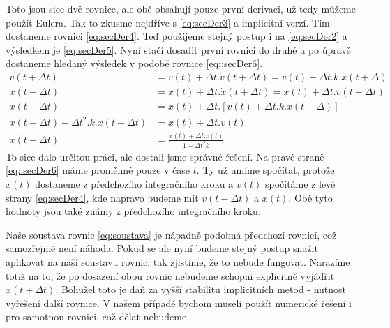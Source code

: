 Toto jsou sice dvě rovnice, ale obě obsahují pouze první derivaci, už tedy můžeme použít Eulera. Tak to zkusme nejdříve s \eqref{eq:secDer3} a implicitní verzí. Tím dostaneme rovnici \eqref{eq:secDer4}. Teď použijeme stejný postup i na \eqref{eq:secDer2} a výsledkem je \eqref{eq:secDer5}. Nyní stačí dosadit první rovnici do druhé a po úpravě dostaneme hledaný výsledek v podobě rovnice \eqref{eq::secDer6}.
\begin{align}
\label{eq:secDer4}
 v(t + \Delta t)&=v(t) + \Delta t . \dot{v}(t + \Delta t)  
 =  v(t) + \Delta t . k.x(t + \Delta)\\
 \label{eq:secDer5}
 x(t+\Delta t) &= x(t) + \Delta t. \dot{x}(t+ \Delta t) = x(t) + \Delta t.v(t+ \Delta t) \\
 \label{eq::secDer6}
 x(t+\Delta t) &= x(t) + \Delta t. \left[ v(t) + \Delta t . k.x(t + \Delta)\right]  \nonumber\\
 x(t+\Delta t) - \Delta t^2 .k.x(t+\Delta t) &=x(t) + \Delta t.  v(t) \nonumber\\
  x(t+\Delta t) &= \frac{x(t) + \Delta t.  v(t)}{1 - \Delta t^2 k}
\end{align}
To sice dalo určitou práci, ale dostali jsme správné řešení. Na pravé straně \eqref{eq::secDer6} máme proměnné pouze v čase $ t $. Ty už umíme spočítat, protože $ x(t) $ dostaneme z předchozího integračního kroku a $ v(t) $ spočítáme z levé strany \eqref{eq:secDer4}, kde napravo budeme mít  $ v(t-\Delta t) $ a $ x(t) $. Obě tyto hodnoty jsou také známy z předchozího integračního kroku.

Naše soustava rovnic \eqref{eq:soustava} je nápadně podobná předchozí rovnicí, což samozřejmě není náhoda. Pokud se ale nyní budeme stejný postup snažit aplikovat na naší soustavu rovnic, tak zjistíme, že to nebude fungovat. Narazíme totiž na to, že po dosazení obou rovnic nebudeme schopni explicitně vyjádřit $ x(t + \Delta t) $. Bohužel toto je daň za vyšší stabilitu implicitních metod - nutnost vyřešení další rovnice. V našem případě bychom museli použít numerické řešení i pro samotnou rovnici, což dělat nebudeme.

